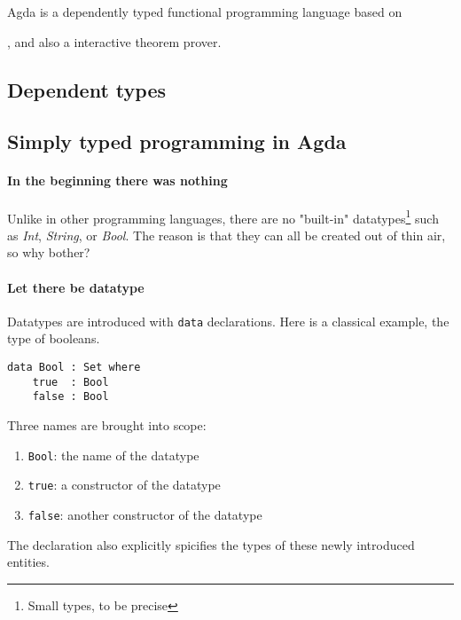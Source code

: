 \documentclass[12pt, a4paper]{article}
\begin{document}
Agda is a dependently typed functional programming language based on 


, and also a interactive
theorem prover.



\subsection{Dependent types}

\subsection{Simply typed programming in Agda}


\paragraph{In the beginning there was nothing}

Unlike in other programming languages, there are no "built-in"
datatypes\footnote{Small types, to be precise} such as \textit{Int}, \textit{String}, or \textit{Bool}.
The reason is that they can all be created out of thin air, so why bother?

\paragraph{Let there be datatype}

Datatypes are introduced with {\lstinline|data|} declarations. Here is a classical example, the type of booleans.

\begin{lstlisting}
data Bool : Set where
    true  : Bool
    false : Bool
\end{lstlisting}

Three names are brought into scope:

\begin{enumerate}
    \item {\lstinline|Bool|}: the name of the datatype
    \item {\lstinline|true|}: a constructor of the datatype
    \item {\lstinline|false|}: another constructor of the datatype
\end{enumerate}

The declaration also explicitly spicifies the types of these newly introduced entities.
\end{document}
